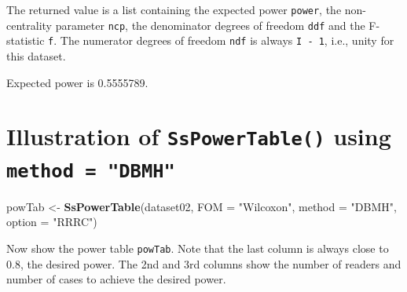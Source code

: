 \documentclass[]{book}
\newenvironment{Shaded}{\begin{snugshade}}{\end{snugshade}}
\newcommand{\CommentTok}[1]{\textcolor[rgb]{0.56,0.35,0.01}{\textit{#1}}}
\newcommand{\DataTypeTok}[1]{\textcolor[rgb]{0.13,0.29,0.53}{#1}}
\newcommand{\KeywordTok}[1]{\textcolor[rgb]{0.13,0.29,0.53}{\textbf{#1}}}
\newcommand{\NormalTok}[1]{#1}
\newcommand{\StringTok}[1]{\textcolor[rgb]{0.31,0.60,0.02}{#1}}
\begin{document}
The returned value is a list containing the expected power \texttt{power}, the non-centrality parameter \texttt{ncp}, the denominator degrees of freedom \texttt{ddf} and the F-statistic \texttt{f}. The numerator degrees of freedom \texttt{ndf} is always \texttt{I\ -\ 1}, i.e., unity for this dataset.

\begin{Shaded}
\end{Shaded}

Expected power is 0.5555789.

\hypertarget{illustration-of-sspowertable-using-method-dbmh}{%
\section{\texorpdfstring{Illustration of \texttt{SsPowerTable()} using \texttt{method\ =\ "DBMH"}}{Illustration of SsPowerTable() using method = "DBMH"}}\label{illustration-of-sspowertable-using-method-dbmh}}

\begin{Shaded}
\begin{Highlighting}[]
\NormalTok{powTab <-}\StringTok{ }\KeywordTok{SsPowerTable}\NormalTok{(dataset02, }\DataTypeTok{FOM =} \StringTok{"Wilcoxon"}\NormalTok{, }\DataTypeTok{method =} \StringTok{"DBMH"}\NormalTok{, }\DataTypeTok{option =} \StringTok{"RRRC"}\NormalTok{)}
\end{Highlighting}
\end{Shaded}

Now show the power table \texttt{powTab}. Note that the last column is always close to 0.8, the desired power. The 2nd and 3rd columns show the number of readers and number of cases to achieve the desired power.
\end{document}
